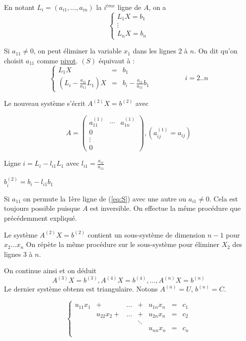 \documentclass[a4paper,11pt]{article}
\newcommand{\reff}[1]{(\ref{#1})}
\theoremstyle{plain} %
\begin{document}
En notant $L_i = (a_{i1}, \dots, a_{in})$ la $i^{ème}$ ligne de $A$, on a
\begin{equation}
    \left\lbrace
    \begin{array}{ccc}
        L_1 X = b_1 \\
        \vdots \\
        L_n X = b_n
    \end{array}\right.
    \tag{S}
    \label{eq:S}
\end{equation}


Si $a_{11} \neq 0$, on peut éliminer la variable $x_1$ dans les lignes 2 à $n$. On dit qu'on choisit $a_{11}$ comme \underline{pivot}.
$(S)$ équivaut à :
\[
    \left\lbrace
    \begin{array}{ccc}
        L_{1}X & = & b_1 \\
        (L_i - \frac{a_{i1}}{a_{11}}L_1) X & = & b_i - \frac{a_{i1}}{a_{11}}b_1 
    \end{array}\right.
    \hspace{2cm} i = 2..n
\]

Le nouveau système s'écrit $A^{(2)}X =b^{(2)}$ avec

\[
    A = 
    \begin{pmatrix}
        a_{11}^{(1)} & \cdots & a_{1n}^{(1)} \\
        0 \\
        \vdots \\
        0
    \end{pmatrix} 
    ,
    (a_{ij}^{(1)} = a_{ij})
\]

Ligne $i = L_i - l_{i1}L_1$ avec $l_{i1} = \frac{a_{i1}}{a_{11}}$

$b_i^{(2)} =  b_i - l_{i1}b_1$

Si $a_{11}$ on permute la 1ère ligne de \reff{eq:S} avec une autre ou $a_{i1} \neq 0$. Cela est toujours possible puisque $A$ est inversible.
On effectue la même procédure que précédemment expliqué.

Le système $A^{(2)} X = b^{(2)}$ contient un sous-système de dimension $n-1$ pour $x_2\dots x_n$
On répète la même procédure sur le sous-système pour éliminer $X_2$ des lignes 3 à $n$.

On continue ainsi et on déduit
\[
    A^{(3)}X = b^{(3)}, A^{(4)}X = b^{(4)}, \dots, A^{(n)}X=b^{(n)}
\]
Le dernier système obtenu est triangulaire. Notons $A^{(n)}=U$, $b^{(n)}=C$.

\begin{equation}
    \left\lbrace
    \begin{array}{ccccccc}
        u_{11}x_1 & + & \dots & + & u_{1n}x_n & = & c_1 \\
                  & u_{22}x_2 + & \dots & + & u_{2n}x_n & = & c_2 \\
        & & & \ddots \\
        & & & & u_{nn}x_n & = & c_n \\
    \end{array}\right.
    \tag{S'}
    \label{eq:S2}
\end{equation}
\end{document}
